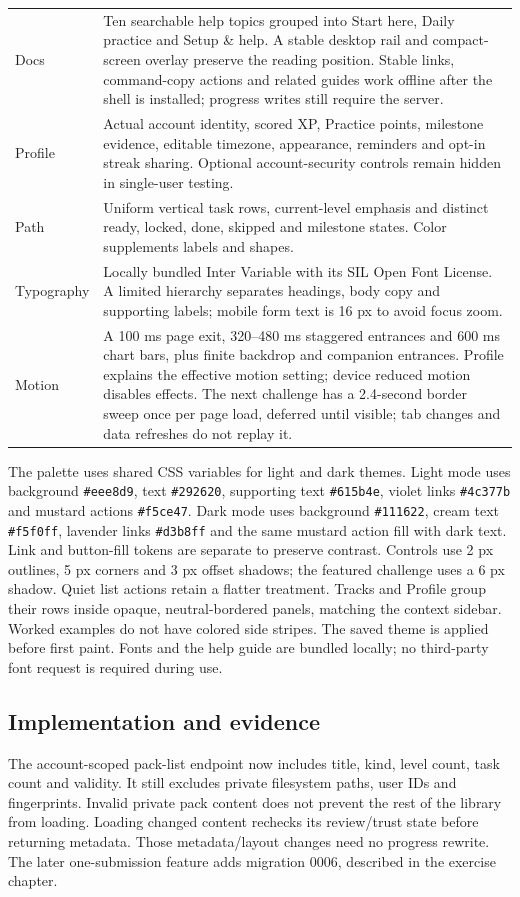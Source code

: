 \begin{longtable}{P{.22\textwidth}P{.70\textwidth}}
Docs & Ten searchable help topics grouped into Start here, Daily practice and Setup \& help. A stable desktop rail and compact-screen overlay preserve the reading position. Stable links, command-copy actions and related guides work offline after the shell is installed; progress writes still require the server.\\
Profile & Actual account identity, scored XP, Practice points, milestone evidence, editable timezone, appearance, reminders and opt-in streak sharing. Optional account-security controls remain hidden in single-user testing.\\
Path & Uniform vertical task rows, current-level emphasis and distinct ready, locked, done, skipped and milestone states. Color supplements labels and shapes.\\
Typography & Locally bundled Inter Variable with its SIL Open Font License. A limited hierarchy separates headings, body copy and supporting labels; mobile form text is 16 px to avoid focus zoom.\\
Motion & A 100 ms page exit, 320--480 ms staggered entrances and 600 ms chart bars, plus finite backdrop and companion entrances. Profile explains the effective motion setting; device reduced motion disables effects. The next challenge has a 2.4-second border sweep once per page load, deferred until visible; tab changes and data refreshes do not replay it.\\
\end{longtable}

The palette uses shared CSS variables for light and dark themes. Light mode uses
background \texttt{\#eee8d9}, text \texttt{\#292620}, supporting text
\texttt{\#615b4e}, violet links \texttt{\#4c377b} and mustard actions
\texttt{\#f5ce47}. Dark mode uses background \texttt{\#111622}, cream text
\texttt{\#f5f0ff}, lavender links \texttt{\#d3b8ff} and the same mustard action
fill with dark text. Link and button-fill tokens are separate to preserve contrast.
Controls use 2 px outlines, 5 px corners and 3 px offset shadows; the featured
challenge uses a 6 px shadow. Quiet list actions retain a flatter treatment.
Tracks and Profile group their rows inside opaque, neutral-bordered panels,
matching the context sidebar. Worked examples do not have colored side stripes.
The saved theme is applied before first paint. Fonts and the help guide are
bundled locally; no third-party font request is required during use.

\subsection{Implementation and evidence}
The account-scoped pack-list endpoint now includes title, kind, level count, task
count and validity. It still excludes private filesystem paths, user IDs and
fingerprints. Invalid private pack content does not prevent the rest of the library
from loading. Loading changed content rechecks its review/trust state before
returning metadata. Those metadata/layout changes need no progress rewrite. The
later one-submission feature adds migration 0006, described in the exercise chapter.

